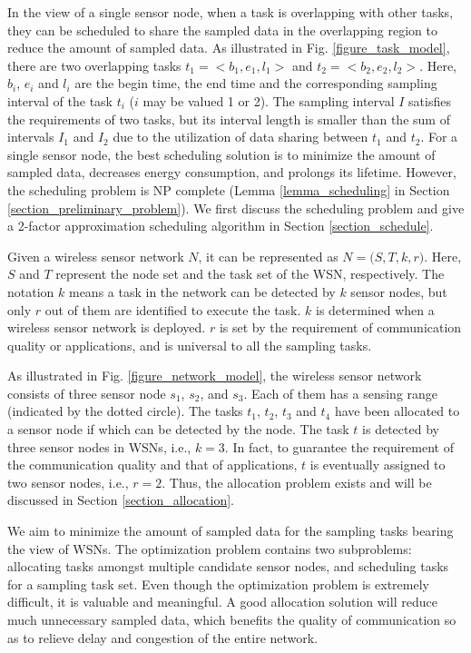 \documentclass[prodmode,acmtosn]{acmsmall}
\begin{document}
In the view of a single sensor node, when a task is overlapping with other tasks, they can be scheduled to share the sampled data in the overlapping region to reduce the amount of sampled data. As illustrated in Fig. \ref{figure_task_model}, there are two overlapping tasks $t_1\mathrm{=<}b_1,e_1,l_1\mathrm{>}$ and $t_2\mathrm{=<}b_2,e_2,l_2\mathrm{>}$. Here, $b_i$, $e_i$ and $l_i$ are the begin time, the end time and the corresponding sampling interval of the task $t_i$ ($i$ may be valued 1 or 2).  The sampling interval $I$ satisfies the requirements of two tasks, but its interval length  is smaller than the sum of intervals $I_1$ and $I_2$ due to the utilization of data sharing between $t_1$ and $t_2$. For a single sensor node, the best scheduling solution is to minimize the amount of sampled data, decreases energy consumption, and prolongs its lifetime. However, the scheduling problem is NP complete (Lemma \ref{lemma_scheduling} in Section \ref{section_preliminary_problem}). We first discuss the scheduling problem and give a 2-factor approximation scheduling algorithm in Section \ref{section_schedule}.

\begin{definition}
Given a wireless sensor network $N$, it can be represented as $N\mathrm{=(}S,T,k,r\mathrm{)}$. Here, $S$ and $T$ represent the node set and the task set of the WSN, respectively. The notation $k$ means a task in the network can be detected by $k$ sensor nodes, but only $r$ out of them are identified to execute the task. $k$ is determined when a wireless sensor network is deployed. $r$ is set by the  requirement of communication quality or applications, and is universal to all the sampling tasks.
\label{system_model}
\end{definition}

As illustrated in Fig. \ref{figure_network_model}, the wireless sensor network consists of three sensor node $s_1$, $s_2$, and $s_3$. Each of them has a sensing range (indicated by the dotted circle). The  tasks $t_1$, $t_2$, $t_3$ and $t_4$ have been allocated to a sensor node if which can be detected by the node. The task $t$ is detected by three sensor nodes in WSNs, i.e., $k \mathrm{=} 3$. In fact, to guarantee the requirement of the communication quality and that of applications, $t$ is eventually assigned to two sensor nodes, i.e., $r\mathrm{=}2$. Thus, the allocation problem exists and will be discussed in Section \ref{section_allocation}.


We aim to minimize the amount of sampled data for the sampling tasks bearing the view of WSNs. The optimization problem contains two subproblems: allocating tasks amongst multiple candidate sensor nodes, and scheduling tasks for a sampling task set. Even though the optimization problem is extremely difficult, it is valuable and meaningful. A good allocation solution will reduce much unnecessary sampled data, which benefits the quality of communication so as to relieve delay and congestion of the entire network.
\end{document}
